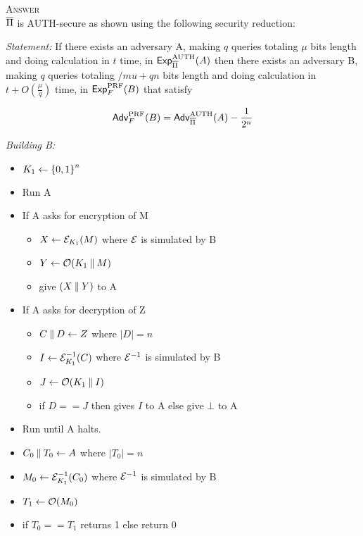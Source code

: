 \documentclass[11pt]{article}
\begin{document}
\textsc{Answer}\\
$\overline{\Pi}$ is AUTH-secure as shown using the following security reduction:

\textit{Statement: } If there exists an adversary A, making $q$ queries totaling $\mu$ bits length and doing calculation in $t$ time, in $\mathsf{Exp}^{\mathrm{AUTH}}_{\overline{\Pi}}{(A)}$ then there exists an adversary B, making $q$ queries totaling $/mu + qn$ bits length and doing calculation in $t + O(\frac{\mu}{q})$ time, in $\mathsf{Exp}^{\mathrm{PRF}}_{F}{(B)}$ that satisfy

\begin{eqnarray*}
\mathsf{Adv}^{\mathrm{PRF}}_{F}{(B)} = \mathsf{Adv}^{\mathrm{AUTH}}_{\overline{\Pi}}{(A)} -  \frac{1}{2^n}
\end{eqnarray*}

\textit{Building B:}\\
\begin{itemize}
\item $K_1 \gets {\{0,1\}}^n$
\item Run A
\item If A asks for encryption of M
\begin{itemize}
\item $X \gets {\cal E}_{K_1}(M)$ where ${\cal E}$ is simulated by B
\item $Y \gets {\cal O}(K_1 \:\|\: M)$
\item give $(X \:\|\: Y)$ to A
\end{itemize}
\item If A asks for decryption of Z
\begin{itemize}
\item $C \:\|\: D \gets Z$ where $|D|=n$
\item $I \gets {\cal E}^{-1}_{K_1}(C)$ where ${\cal E}^{-1}$ is simulated by B
\item $J \gets {\cal O}(K_1 \:\|\: I)$
\item if $D==J$ then gives $I$ to A else give $\bot$ to A
\end{itemize}
\item Run until A halts.
\item $C_0 \:\|\: T_0 \gets A$ where $|T_0|=n$
\item $M_0 \gets {\cal E}^{-1}_{K_1}(C_0)$ where ${\cal E}^{-1}$ is simulated by B
\item $T_1 \gets {\cal O}(M_0)$
\item if $T_0 == T_1$ returns 1 else return 0
\end{itemize}
\end{document}
